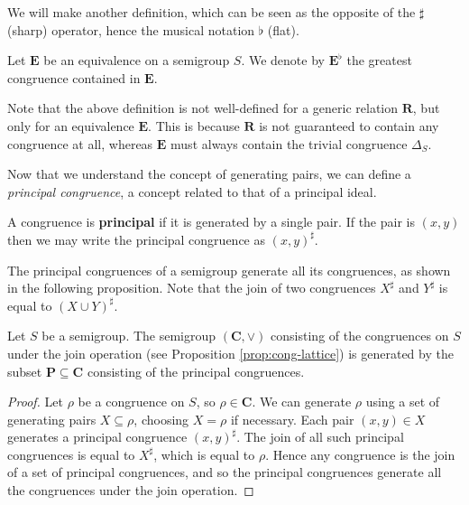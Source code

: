 We will make another definition, which can be seen as the opposite of the
$\sharp$ (sharp) operator, hence the musical notation $\flat$ (flat).

\begin{definition}
  \label{def:e-flat}
  Let $\mathbf{E}$ be an equivalence on a semigroup $S$.  We denote by
  $\mathbf{E}^\flat$ the greatest congruence contained in $\mathbf{E}$.
\end{definition}

Note that the above definition is not well-defined for a generic relation
$\mathbf{R}$, but only for an equivalence $\mathbf{E}$.  This is because
$\mathbf{R}$ is not guaranteed to contain any congruence at all, whereas
$\mathbf{E}$ must always contain the trivial congruence $\Delta_S$.

Now that we understand the concept of generating pairs, we can define a
\textit{principal congruence}, a concept related to that of a principal ideal.

\begin{definition}
  \label{def:principal-cong}
  A congruence is \textbf{principal} if it is generated by a single pair.  If
  the pair is $(x,y)$ then we may write the principal congruence as
  $(x,y)^\sharp$.
\end{definition}

The principal congruences of a semigroup generate all its congruences, as shown
in the following proposition.  Note that the join of two congruences $X^\sharp$
and $Y^\sharp$ is equal to $(X \cup Y)^\sharp$.

\begin{proposition}
  \label{prop:congruence-lattice-gens}
  Let $S$ be a semigroup.  The semigroup $(\mathbf{C}, \vee)$ consisting of the
  congruences on $S$ under the join operation (see Proposition
  \ref{prop:cong-lattice}) is generated by the subset
  $\mathbf{P} \subseteq \mathbf{C}$ consisting of the principal congruences.
  \begin{proof}
    Let $\rho$ be a congruence on $S$, so $\rho \in \mathbf{C}$.  We can
    generate $\rho$ using a set of generating pairs $X \subseteq \rho$, choosing
    $X = \rho$ if necessary.  Each pair $(x,y) \in X$ generates a principal
    congruence $(x,y)^\sharp$.  The join of all such principal congruences is
    equal to $X^\sharp$, which is equal to $\rho$.  Hence any congruence is the
    join of a set of principal congruences, and so the principal congruences
    generate all the congruences under the join operation.
  \end{proof}
\end{proposition}

